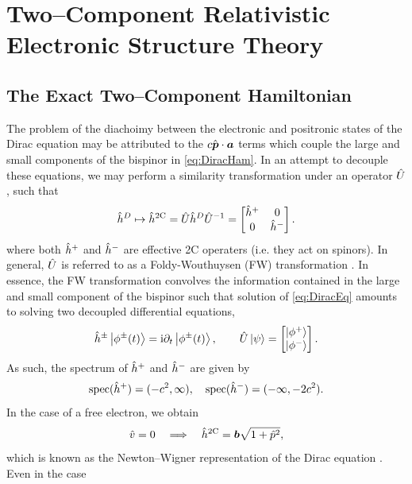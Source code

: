 \chapter{Two--Component Relativistic Electronic Structure Theory}
\label{ch:2CEST}


\section{The Exact Two--Component Hamiltonian}
\label{sec:X2C}

The problem of the diachoimy between the electronic and positronic states of the Dirac
equation may be attributed to the $c \hat{\boldsymbol{p}} \cdot \boldsymbol{a}$ terms which couple the 
large and small components of the bispinor in \cref{eq:DiracHam}. In an attempt
to decouple these equations, we may perform a similarity transformation under an operator $\hat{U}$, such that
\begin{equation}
\label{eq:FW}
\hat{h}^D \mapsto \hat{h}^{\mathrm{2C}}  = \hat{U} \hat{h}^D \hat{U}^{-1} = \begin{bmatrix} \hat{h}^+ & 0 \\ 0 & \hat{h}^- \end{bmatrix}.
\end{equation}
where both $\hat{h}^+$ and $\hat{h}^-$ are effective 2C operaters (i.e. they act on spinors).
In general, $\hat{U}$ is referred to as a Foldy-Wouthuysen (FW) transformation .
In essence, the FW transformation convolves the information contained in the large and small
component of the bispinor such that solution of \cref{eq:DiracEq} amounts to solving two decoupled 
differential equations,
\begin{align}
\hat{h}^\pm \left\vert  \phi^\pm (t)  \right\rangle = \mathrm i \partial_t \left\vert \phi^\pm (t) \right\rangle, \qquad \hat{U} \left\vert \psi \right\rangle = \begin{bmatrix} \left\vert \phi^+ \right\rangle \\ \left\vert \phi^- \right\rangle \end{bmatrix}.
\end{align}
As such, the spectrum of $\hat{h}^+$ and $\hat{h}^-$ are given by
\begin{equation}
\mathrm{spec}(\hat{h}^+) = (-c^2,\infty), \quad 
\mathrm{spec}(\hat{h}^-) = (-\infty,-2c^2).
\end{equation}
In the case of a free electron, we obtain 
\begin{equation}
\label{eq:NWRep}
\hat{v} = 0 \quad \Longrightarrow \quad \hat{h}^{\mathrm{2C}} = \boldsymbol{b} \sqrt{1 + \hat{p}^2},
\end{equation}
which is known as the Newton--Wigner representation of the Dirac equation . Even in the case
